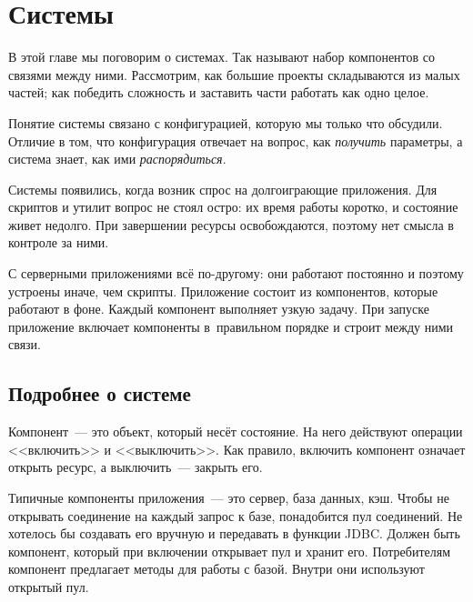 \chapter{Системы}

\label{chapter-systems}


\begin{teaser}
В этой главе мы поговорим о системах. Так называют набор компонентов со связями
между ними. Рассмотрим, как большие проекты складываются из малых частей; как
победить сложность и заставить части работать как одно целое.
\end{teaser}

Понятие системы связано с конфигурацией, которую мы только что обсудили. Отличие
в том, что конфигурация отвечает на вопрос, как \emph{получить} параметры, а
система знает, как ими \emph{распорядиться}.

Системы появились, когда возник спрос на долгоиграющие приложения. Для скриптов
и утилит вопрос не стоял остро: их время работы коротко, и состояние живет
недолго. При завершении ресурсы освобождаются, поэтому нет смысла в контроле за
ними.

С серверными приложениями всё по-другому: они работают постоянно и поэтому
устроены иначе, чем скрипты. Приложение состоит из компонентов, которые работают
в фоне. Каждый компонент выполняет узкую задачу. При запуске приложение включает
компоненты в~правильном порядке и строит между ними связи.

\section{Подробнее о системе}


Компонент~--- это объект, который несёт состояние. На него действуют операции
<<включить>> и <<выключить>>. Как правило, включить компонент означает открыть
ресурс, а выключить~--- закрыть его.


Типичные компоненты приложения~--- это сервер, база данных, кэш. Чтобы не открывать
соединение на каждый запрос к базе, понадобится пул соединений. Не хотелось бы
создавать его вручную и передавать в функции JDBC. Должен быть компонент,
который при включении открывает пул и хранит его. Потребителям компонент
предлагает методы для работы с базой. Внутри они используют открытый пул.


